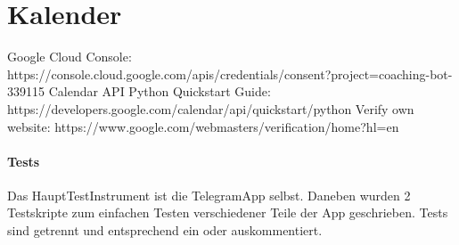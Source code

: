     \section{}
    
    \section{}
    
    \section{}
    
    \section{}
    
    
    
    \section{Kalender}
    Google Cloud Console: https://console.cloud.google.com/apis/credentials/consent?project=coaching-bot-339115 
    Calendar API Python Quickstart Guide: https://developers.google.com/calendar/api/quickstart/python 
    Verify own website: https://www.google.com/webmasters/verification/home?hl=en
    
    
    \paragraph{Tests}
    Das Haupt\-Test\-Instrument ist die Telegram\-App selbst. Daneben wurden 2 Testskripte zum einfachen Testen verschiedener Teile der App geschrieben. Tests sind getrennt und entsprechend ein\- oder auskommentiert. 